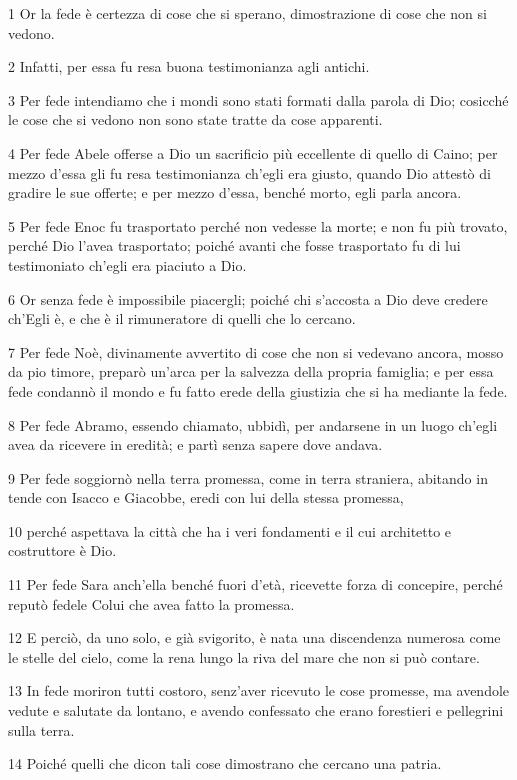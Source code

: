 \par 1 Or la fede è certezza di cose che si sperano, dimostrazione di cose che non si vedono.
\par 2 Infatti, per essa fu resa buona testimonianza agli antichi.
\par 3 Per fede intendiamo che i mondi sono stati formati dalla parola di Dio; cosicché le cose che si vedono non sono state tratte da cose apparenti.
\par 4 Per fede Abele offerse a Dio un sacrificio più eccellente di quello di Caino; per mezzo d'essa gli fu resa testimonianza ch'egli era giusto, quando Dio attestò di gradire le sue offerte; e per mezzo d'essa, benché morto, egli parla ancora.
\par 5 Per fede Enoc fu trasportato perché non vedesse la morte; e non fu più trovato, perché Dio l'avea trasportato; poiché avanti che fosse trasportato fu di lui testimoniato ch'egli era piaciuto a Dio.
\par 6 Or senza fede è impossibile piacergli; poiché chi s'accosta a Dio deve credere ch'Egli è, e che è il rimuneratore di quelli che lo cercano.
\par 7 Per fede Noè, divinamente avvertito di cose che non si vedevano ancora, mosso da pio timore, preparò un'arca per la salvezza della propria famiglia; e per essa fede condannò il mondo e fu fatto erede della giustizia che si ha mediante la fede.
\par 8 Per fede Abramo, essendo chiamato, ubbidì, per andarsene in un luogo ch'egli avea da ricevere in eredità; e partì senza sapere dove andava.
\par 9 Per fede soggiornò nella terra promessa, come in terra straniera, abitando in tende con Isacco e Giacobbe, eredi con lui della stessa promessa,
\par 10 perché aspettava la città che ha i veri fondamenti e il cui architetto e costruttore è Dio.
\par 11 Per fede Sara anch'ella benché fuori d'età, ricevette forza di concepire, perché reputò fedele Colui che avea fatto la promessa.
\par 12 E perciò, da uno solo, e già svigorito, è nata una discendenza numerosa come le stelle del cielo, come la rena lungo la riva del mare che non si può contare.
\par 13 In fede moriron tutti costoro, senz'aver ricevuto le cose promesse, ma avendole vedute e salutate da lontano, e avendo confessato che erano forestieri e pellegrini sulla terra.
\par 14 Poiché quelli che dicon tali cose dimostrano che cercano una patria.
